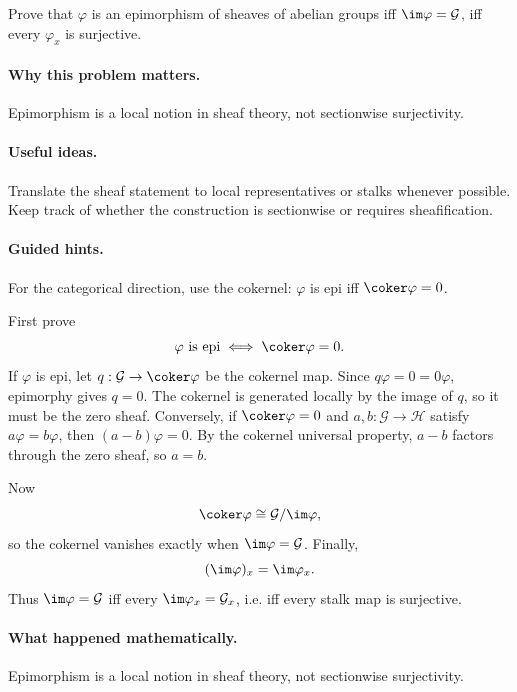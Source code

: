 \begin{problem}\label{prob:vi15-p10}
Prove that $\varphi$ is an epimorphism of sheaves of abelian groups iff $\im\varphi=\mathcal G$, iff every $\varphi_x$ is surjective.
\end{problem}

\ifdefined\FullProblemDossiers
\paragraph{Why this problem matters.}
Epimorphism is a local notion in sheaf theory, not sectionwise surjectivity.

\paragraph{Useful ideas.}
Translate the sheaf statement to local representatives or stalks whenever possible.  Keep track of whether the construction is sectionwise or requires sheafification.

\paragraph{Guided hints.}
For the categorical direction, use the cokernel: $\varphi$ is epi iff $\coker\varphi=0$.

\begin{solution}
First prove
\[
\varphi\text{ is epi}\iff\coker\varphi=0.
\]
If $\varphi$ is epi, let $q:\mathcal G\to\coker\varphi$ be the cokernel map. Since $q\varphi=0=0\varphi$, epimorphy gives $q=0$. The cokernel is generated locally by the image of $q$, so it must be the zero sheaf. Conversely, if $\coker\varphi=0$ and $a,b:\mathcal G\to\mathcal H$ satisfy $a\varphi=b\varphi$, then $(a-b)\varphi=0$. By the cokernel universal property, $a-b$ factors through the zero sheaf, so $a=b$.

Now
\[
\coker\varphi\cong\mathcal G/\im\varphi,
\]
so the cokernel vanishes exactly when $\im\varphi=\mathcal G$. Finally,
\[
(\im\varphi)_x=\im\varphi_x.
\]
Thus $\im\varphi=\mathcal G$ iff every $\im\varphi_x=\mathcal G_x$, i.e. iff every stalk map is surjective.
\end{solution}

\paragraph{What happened mathematically.}
Epimorphism is a local notion in sheaf theory, not sectionwise surjectivity.

